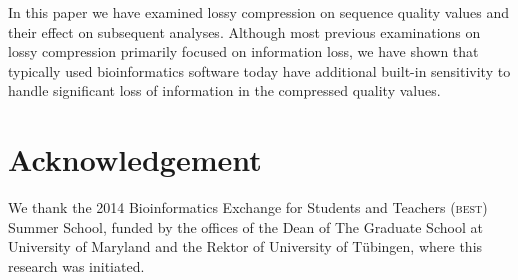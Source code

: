 In this paper we have examined lossy compression on sequence quality
values and their effect on subsequent analyses. Although most previous
examinations on lossy compression primarily focused on information
loss, we have shown that typically used bioinformatics software today
have additional built-in sensitivity to handle significant loss of
information in the compressed quality values.

\section*{Acknowledgement}
We thank the 2014 Bioinformatics
Exchange for Students and Teachers (\textsc{best}) Summer School,
funded by the offices of the Dean of The Graduate School at University
of Maryland and the Rektor of University of T\"{u}bingen, where this
research was initiated.
